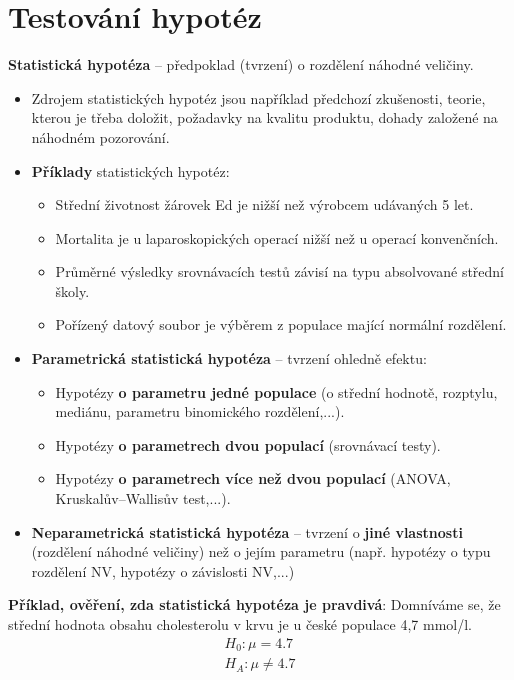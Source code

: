 \section{Testování hypotéz}
\textbf{Statistická hypotéza} -- předpoklad (tvrzení) o rozdělení náhodné veličiny.
\begin{itemize}
    \item Zdrojem statistických hypotéz jsou například předchozí zkušenosti, teorie, kterou je třeba doložit, požadavky na kvalitu produktu, dohady založené na náhodném pozorování.
    \item \textbf{Příklady} statistických hypotéz:
          \begin{itemize}
              \item Střední životnost žárovek Ed je nižší než výrobcem udávaných 5 let.
              \item Mortalita je u laparoskopických operací nižší než u operací konvenčních.
              \item Průměrné výsledky srovnávacích testů závisí na typu absolvované střední školy.
              \item Pořízený datový soubor je výběrem z populace mající normální rozdělení.
          \end{itemize}
    \item \textbf{Parametrická statistická hypotéza} -- tvrzení ohledně efektu:
          \begin{itemize}
              \item Hypotézy \textbf{o parametru jedné populace} (o střední hodnotě, rozptylu, mediánu, parametru binomického rozdělení,...).
              \item Hypotézy \textbf{o parametrech dvou populací} (srovnávací testy).
              \item Hypotézy \textbf{o parametrech více než dvou populací} (ANOVA, Kruskalův--Wallisův test,...).
          \end{itemize}
    \item \textbf{Neparametrická statistická hypotéza} -- tvrzení o \textbf{jiné vlastnosti} (rozdělení náhodné veličiny) než o jejím parametru (např. hypotézy o typu rozdělení NV, hypotézy o závislosti NV,...)
\end{itemize}
\textbf{Příklad, ověření, zda statistická hypotéza je pravdivá}: Domníváme se, že střední hodnota obsahu cholesterolu v krvu je u české populace 4,7 mmol/l.
\begin{equation*}
    \begin{split}
        H_0 : \mu = 4.7	 \\
        H_A : \mu \not = 4.7
    \end{split}
\end{equation*}
